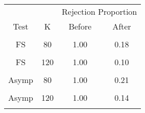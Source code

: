 \begin{table}[!h]
\centering
\begin{tabular}{cccc}
\toprule
\multicolumn{1}{c}{ } & \multicolumn{1}{c}{ } & \multicolumn{2}{c}{Rejection Proportion} \\
\cmidrule(l{3pt}r{3pt}){3-4}
Test & K & Before & After\\
\midrule
\cellcolor{gray!6}{FS} & \cellcolor{gray!6}{60} & \cellcolor{gray!6}{1.00} & \cellcolor{gray!6}{0.14}\\
FS & 80 & 1.00 & 0.18\\
\cellcolor{gray!6}{FS} & \cellcolor{gray!6}{100} & \cellcolor{gray!6}{1.00} & \cellcolor{gray!6}{0.13}\\
FS & 120 & 1.00 & 0.10\\
\cellcolor{gray!6}{Asymp} & \cellcolor{gray!6}{60} & \cellcolor{gray!6}{1.00} & \cellcolor{gray!6}{0.18}\\
\addlinespace
Asymp & 80 & 1.00 & 0.21\\
\cellcolor{gray!6}{Asymp} & \cellcolor{gray!6}{100} & \cellcolor{gray!6}{1.00} & \cellcolor{gray!6}{0.19}\\
Asymp & 120 & 1.00 & 0.14\\
\cellcolor{gray!6}{ECE} & \cellcolor{gray!6}{} & \cellcolor{gray!6}{0.23} & \cellcolor{gray!6}{0.13}\\
\bottomrule
\end{tabular}
\end{table}
